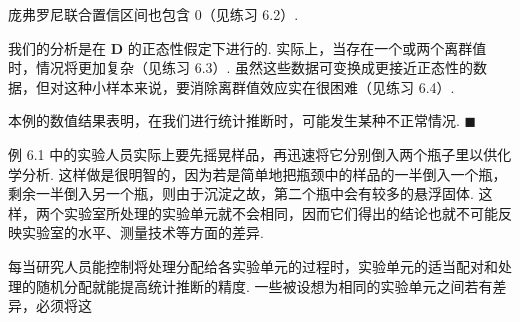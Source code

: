 庞弗罗尼联合置信区间也包含 0（见练习 6.2）.

我们的分析是在 $\mathbf{D}$ 的正态性假定下进行的. 实际上，当存在一个或两个离群值时，情况将更加复杂（见练习 6.3）. 虽然这些数据可变换成更接近正态性的数据，但对这种小样本来说，要消除离群值效应实在很困难（见练习 6.4）.

本例的数值结果表明，在我们进行统计推断时，可能发生某种不正常情况. \hfill$\blacksquare$

例 6.1 中的实验人员实际上要先摇晃样品，再迅速将它分别倒入两个瓶子里以供化学分析. 这样做是很明智的，因为若是简单地把瓶颈中的样品的一半倒入一个瓶，剩余一半倒入另一个瓶，则由于沉淀之故，第二个瓶中会有较多的悬浮固体. 这样，两个实验室所处理的实验单元就不会相同，因而它们得出的结论也就不可能反映实验室的水平、测量技术等方面的差异.

每当研究人员能控制将处理分配给各实验单元的过程时，实验单元的适当配对和处理的随机分配就能提高统计推断的精度. 一些被设想为相同的实验单元之间若有差异，必须将这
